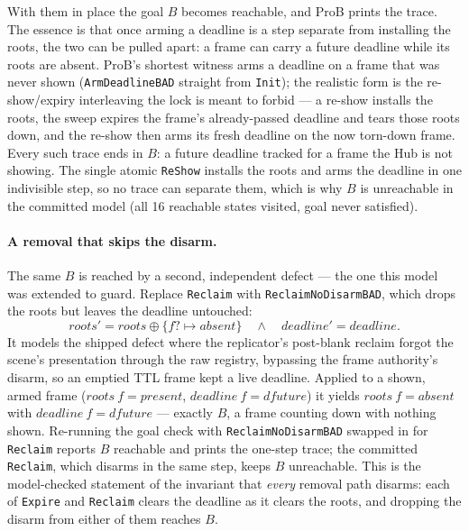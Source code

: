 \documentclass[a4paper,10pt,fleqn]{article}
\begin{document}
With them in place the goal $B$ becomes reachable, and ProB prints the trace. The
essence is that once arming a deadline is a step separate from installing the
roots, the two can be pulled apart: a frame can carry a future deadline while its
roots are absent. ProB's shortest witness arms a deadline on a frame that was
never shown (\texttt{ArmDeadlineBAD} straight from \texttt{Init}); the realistic
form is the re-show/expiry interleaving the lock is meant to forbid --- a re-show
installs the roots, the sweep expires the frame's already-passed deadline and tears
those roots down, and the re-show then arms its fresh deadline on the now
torn-down frame. Every such trace ends in $B$: a future deadline tracked for a
frame the Hub is not showing. The single atomic \texttt{ReShow} installs the roots
and arms the deadline in one indivisible step, so no trace can separate them, which
is why $B$ is unreachable in the committed model (all 16 reachable states visited,
goal never satisfied).

\paragraph{A removal that skips the disarm.}
The same $B$ is reached by a second, independent defect --- the one this model was
extended to guard. Replace \texttt{Reclaim} with \texttt{ReclaimNoDisarmBAD}, which
drops the roots but leaves the deadline untouched:
\[
  roots' = roots \oplus \{ f? \mapsto absent \}
  \quad\land\quad deadline' = deadline .
\]
It models the shipped defect where the replicator's post-blank reclaim forgot the
scene's presentation through the raw registry, bypassing the frame authority's
disarm, so an emptied TTL frame kept a live deadline. Applied to a shown, armed
frame ($roots~f = present$, $deadline~f = dfuture$) it yields $roots~f = absent$
with $deadline~f = dfuture$ --- exactly $B$, a frame counting down with nothing
shown. Re-running the goal check with \texttt{ReclaimNoDisarmBAD} swapped in for
\texttt{Reclaim} reports $B$ reachable and prints the one-step trace; the committed
\texttt{Reclaim}, which disarms in the same step, keeps $B$ unreachable. This is the
model-checked statement of the invariant that \emph{every} removal path disarms:
each of \texttt{Expire} and \texttt{Reclaim} clears the
deadline as it clears the roots, and dropping the disarm from either of them
reaches $B$.
\end{document}
